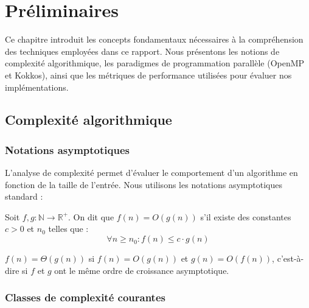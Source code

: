 \chapter{Préliminaires}
\label{chap:preliminaires}

Ce chapitre introduit les concepts fondamentaux nécessaires à la compréhension des techniques employées dans ce rapport. Nous présentons les notions de complexité algorithmique, les paradigmes de programmation parallèle (OpenMP et Kokkos), ainsi que les métriques de performance utilisées pour évaluer nos implémentations.

\section{Complexité algorithmique}
\label{sec:prelim:complexite}

\subsection{Notations asymptotiques}

L'analyse de complexité permet d'évaluer le comportement d'un algorithme en fonction de la taille de l'entrée. Nous utilisons les notations asymptotiques standard :

\begin{definition}
Soit $f, g : \mathbb{N} \to \mathbb{R}^+$. On dit que $f(n) = O(g(n))$ s'il existe des constantes $c > 0$ et $n_0$ telles que :
\[
\forall n \geq n_0 : f(n) \leq c \cdot g(n)
\]
\end{definition}

\begin{definition}
$f(n) = \Theta(g(n))$ si $f(n) = O(g(n))$ et $g(n) = O(f(n))$, c'est-à-dire si $f$ et $g$ ont le même ordre de croissance asymptotique.
\end{definition}

\subsection{Classes de complexité courantes}

